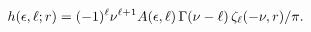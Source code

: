 \[\mathop{h\/}\nolimits\!\left(\epsilon,\ell;r\right)=(-1)^{\ell}\nu^{\ell+1}A(%
\epsilon,\ell)\mathop{\Gamma\/}\nolimits\!\left(\nu-\ell\right)\zeta_{\ell}(-%
\nu,r)/\pi.\]